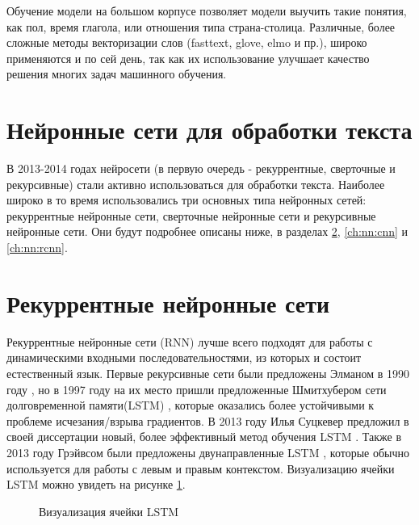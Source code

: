 Обучение модели на большом корпусе позволяет модели выучить такие понятия, как пол, время глагола, или отношения типа страна-столица. Различные, более сложные методы векторизации слов (fasttext, glove, elmo и пр.), широко применяются и по сей день, так как их использование улучшает качество решения многих задач машинного обучения.


\section{Нейронные сети для обработки текста}
В 2013-2014 годах нейросети (в первую очередь - рекуррентные, сверточные и рекурсивные) стали активно использоваться для обработки текста.  Наиболее широко в то время использовались три основных типа нейронных сетей: рекуррентные нейронные сети, сверточные нейронные сети и рекурсивные нейронные сети. Они будут подробнее описаны ниже, в разделах \ref{ch:nn:rnn}, \ref{ch:nn:cnn} и \ref{ch:nn:rcnn}.

\section{Рекуррентные нейронные сети}\label{ch:nn:rnn}
Рекуррентные нейронные сети (RNN) лучше всего подходят для работы с динамическими входными последовательностями, из которых и состоит естественный язык.  Первые рекурсивные сети были предложены Элманом в 1990 году \cite{elman_1990}, но в 1997 году на их место пришли предложенные Шмитхубером сети долговременной памяти(LSTM) \cite{hochreiter_1997}, которые оказались более устойчивыми к проблеме исчезания/взрыва градиентов. В 2013 году Илья Суцкевер предложил в своей диссертации новый, более эффективный метод обучения LSTM \cite{suskever_2013}. Также в 2013 году Грэйвсом были предложены двунаправленные LSTM \cite{graves_2013}, которые обычно используется для работы с левым и правым контекстом. Визуализацию ячейки LSTM можно увидеть на рисунке \ref{fig:Neuro3-LSTM}.  


\begin{figure}[ht]
  \caption{Визуализация ячейки LSTM}\label{fig:Neuro3-LSTM}
\end{figure}


